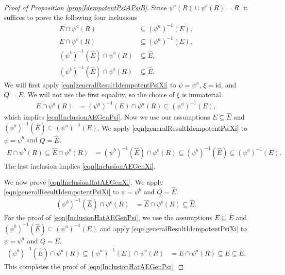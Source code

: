 \documentclass[reqno]{amsart}
\begin{document}
\begin{appendix}
\begin{proof}[Proof of Proposition \ref{prop|IdempotentPsiAPsiB}] 
Since $\psi^a(R)\cup \psi^b(R)=R$, it suffices to prove the following four inclusions \begin{align} E\cap \psi^a(R) &\subseteq  (\psi^a)^{-1}(E) , \label{eqn|InclusionAEGenPsi}\\
E\cap \psi^b(R) &\subseteq  (\psi^a)^{-1}(E)  , \label{eqn|InclusionAEGenXi}\\
(\psi^b)^{-1}(\hat E)\cap \psi^a(R)&\subseteq  \hat E,  \label{eqn|InclusionHatAEGenPsi}\\
(\psi^b)^{-1}(\hat E)\cap \psi^b(R)&\subseteq  \hat E. \label{eqn|InclusionHatAEGenXi}
  \end{align}
We will first apply \eqref{eqn|generalResultIdempotentPsiXi} to $\psi=\psi^a$, $\xi=\mathrm{id}$, and $Q=E$. We will not use the first equality, so the choice of $\xi$ is immaterial.
 \begin{align*}E\cap \psi^a(R) & =(\psi^a)^{-1}(E)\cap \psi^a(R)\subseteq (\psi^a)^{-1}(E),\end{align*}
which implies \eqref{eqn|InclusionAEGenPsi}.
Now we use our assumptions $E\subseteq \hat E$ and $(\psi^b)^{-1}(\hat E)\subseteq (\psi^a)^{-1}(E)$. We apply \eqref{eqn|generalResultIdempotentPsiXi} to $\psi=\psi^b$ and $Q=\hat E$. 
\begin{align*}
E\cap \psi^b(R)\subseteq \hat E\cap \psi^b(R)&= (\psi^b)^{-1}(\hat E)\cap \psi^b(R)\subseteq (\psi^b)^{-1}(\hat E)\subseteq (\psi^a)^{-1}(E).
\end{align*}
The last inclusion implies \eqref{eqn|InclusionAEGenXi}.
 
  
We now prove \eqref{eqn|InclusionHatAEGenXi}. We apply \eqref{eqn|generalResultIdempotentPsiXi} to $\psi=\psi^b$ and $Q=\hat E$.
\begin{align*}
(\psi^b)^{-1}(\hat E)\cap \psi^b(R)&=\hat E\cap \psi^b(R)\subseteq \hat E.
\end{align*}
For the proof of \eqref{eqn|InclusionHatAEGenPsi}, we use the assumptions $E\subseteq \hat E$ and $(\psi^b)^{-1}(\hat E)\subseteq (\psi^a)^{-1}(E)$ and apply 
\eqref{eqn|generalResultIdempotentPsiXi} to $\psi=\psi^a$ and $Q= E$.
\begin{align*}
(\psi^b)^{-1}(\hat E)\cap \psi^a(R)\subseteq (\psi^a)^{-1}(E)\cap \psi^a(R)&=E\cap \psi^a(R)\subseteq E\subseteq \hat E.
\end{align*}
This completes the proof of \eqref{eqn|InclusionHatAEGenPsi}. 
 \end{proof} 
 


\end{appendix}
\end{document}
